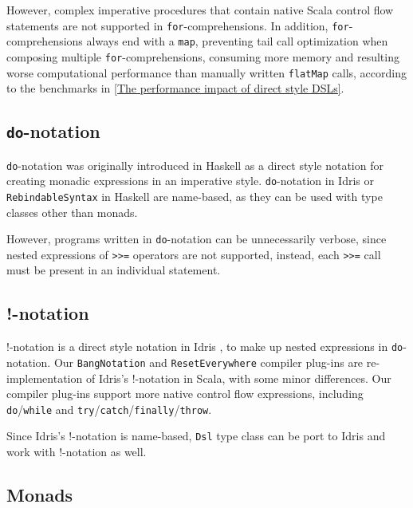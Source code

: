 However, complex imperative procedures that contain native Scala control flow statements are not supported in \lstinline{for}-comprehensions. In addition, \lstinline{for}-comprehensions always end with a \lstinline{map}, preventing tail call optimization when composing multiple \lstinline{for}-comprehensions, consuming more memory and resulting worse computational performance than manually written \lstinline{flatMap} calls, according to the benchmarks in \cref{The performance impact of direct style DSLs}.

\subsection{\lstinline{do}-notation}\label{do-notation}

\lstinline{do}-notation was originally introduced in Haskell \cite{jones1998haskell} as a direct style notation for creating monadic expressions in an imperative style. \lstinline{do}-notation in Idris or \lstinline{RebindableSyntax} in Haskell are name-based, as they can be used with type classes other than monads.

However, programs written in \lstinline{do}-notation can be unnecessarily verbose, since nested expressions of \lstinline{>>=} operators are not supported, instead, each \lstinline{>>=} call must be present in an individual statement. 

\subsection{!-notation}

!-notation is a direct style notation in Idris \cite{brady2013idris}, to make up nested expressions in \lstinline{do}-notation. Our \lstinline{BangNotation} and \lstinline{ResetEverywhere} compiler plug-ins are re-implementation of Idris's !-notation in Scala, with some minor differences. Our compiler plug-ins support more native control flow expressions, including \lstinline{do}/\lstinline{while} and \lstinline{try}/\lstinline{catch}/\lstinline{finally}/\lstinline{throw}.

Since Idris's !-notation is name-based, \lstinline{Dsl} type class can be port to Idris and work with !-notation as well.

\subsection{Monads}\label{Monads}

